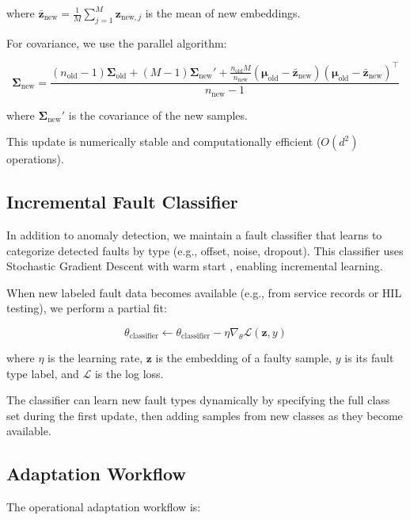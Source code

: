 where $\bar{\mathbf{z}}_{\text{new}} = \frac{1}{M} \sum_{j=1}^{M} \mathbf{z}_{\text{new},j}$ is the mean of new embeddings.

For covariance, we use the parallel algorithm:

\begin{equation}
\boldsymbol{\Sigma}_{\text{new}} = \frac{(n_{\text{old}}-1)\boldsymbol{\Sigma}_{\text{old}} + (M-1)\boldsymbol{\Sigma}_{\text{new}}' + \frac{n_{\text{old}} M}{n_{\text{new}}}(\boldsymbol{\mu}_{\text{old}} - \bar{\mathbf{z}}_{\text{new}})(\boldsymbol{\mu}_{\text{old}} - \bar{\mathbf{z}}_{\text{new}})^\top}{n_{\text{new}}-1}
\end{equation}

where $\boldsymbol{\Sigma}_{\text{new}}'$ is the covariance of the new samples.

This update is numerically stable and computationally efficient ($O(d^2)$ operations).

\subsection{Incremental Fault Classifier}

In addition to anomaly detection, we maintain a fault classifier that learns to categorize detected faults by type (e.g., offset, noise, dropout). This classifier uses Stochastic Gradient Descent with warm start \parencite{pmlr2011online}, enabling incremental learning.

When new labeled fault data becomes available (e.g., from service records or HIL testing), we perform a partial fit:

\begin{equation}
\theta_{\text{classifier}} \leftarrow \theta_{\text{classifier}} - \eta \nabla_\theta \mathcal{L}(\mathbf{z}, y)
\end{equation}

where $\eta$ is the learning rate, $\mathbf{z}$ is the embedding of a faulty sample, $y$ is its fault type label, and $\mathcal{L}$ is the log loss.

The classifier can learn new fault types dynamically by specifying the full class set during the first update, then adding samples from new classes as they become available.

\subsection{Adaptation Workflow}

The operational adaptation workflow is:

